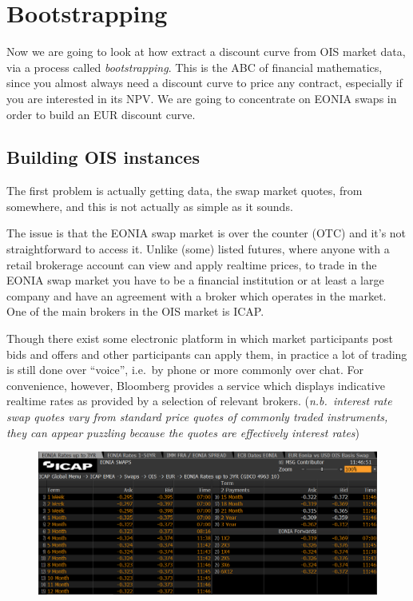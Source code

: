 \section{Bootstrapping}\label{bootstrapping}

Now we are going to look at how extract a discount curve from OIS market data, via a process called \emph{bootstrapping}. This is the ABC of financial mathematics, since you almost always need a discount curve to price any contract, especially if you are interested in its NPV. We are going to concentrate on EONIA swaps in order to build an EUR discount curve.

\subsection{Building OIS instances}\label{building-ois-instances}

The first problem is actually getting data, the swap market quotes, from somewhere, and this is not actually as simple as it sounds.

The issue is that the EONIA swap market is over the counter (OTC) and it's not straightforward to access it. Unlike (some) listed futures, where anyone with a retail brokerage account can view and apply realtime prices, to trade in the EONIA swap market you have to be a financial institution or at least a large company and have an agreement with a broker which operates in the market. One of the main brokers in the OIS market is ICAP.

Though there exist some electronic platform in which market participants post bids and offers and other participants can apply them, in practice a lot of trading is still done over ``voice'', i.e.~by phone or more
commonly over chat. For convenience, however, Bloomberg provides a service which displays indicative realtime rates as provided by a selection of relevant brokers. (\emph{n.b.~interest rate swap quotes vary from standard price quotes of commonly traded instruments, they can appear puzzling because the quotes are effectively interest rates})

\begin{figure}
  \centering
\includegraphics[width=0.8\linewidth]{icap_3.png}
\end{figure}

